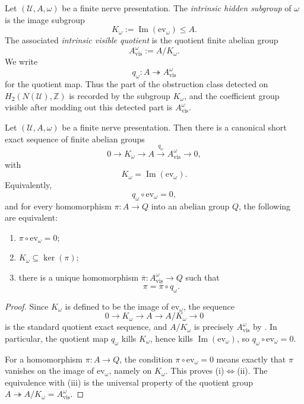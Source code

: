 \begin{definition}\label{def:intrinsic-visible-quotient}
Let $(\mathcal U,A,\omega)$ be a finite nerve presentation. The
\emph{intrinsic hidden subgroup} of $\omega$ is the image subgroup
\[
K_{\omega}:=\operatorname{Im}(\mathrm{ev}_{\omega})\le A.
\]
The associated \emph{intrinsic visible quotient} is the quotient finite
abelian group
\[
A_{\mathrm{vis}}^{\omega}:=A/K_{\omega}.
\]
We write
\[
q_{\omega}:A\twoheadrightarrow A_{\mathrm{vis}}^{\omega}
\]
for the quotient map. Thus the part of the obstruction class detected on
$H_2(N(\mathcal U),\mathbb Z)$ is recorded by the subgroup $K_{\omega}$, and
the coefficient group visible after modding out this detected part is
$A_{\mathrm{vis}}^{\omega}$.
\end{definition}

\begin{proposition}\label{prop:visible-quotient-quotient-sequence}
Let $(\mathcal U,A,\omega)$ be a finite nerve presentation. Then there is a
canonical short exact sequence of finite abelian groups
\[
0\longrightarrow K_{\omega}\longrightarrow A
\xrightarrow{\ q_{\omega}\ } A_{\mathrm{vis}}^{\omega}\longrightarrow 0,
\]
with
\[
K_{\omega}=\operatorname{Im}(\mathrm{ev}_{\omega}).
\]
Equivalently,
\[
q_{\omega}\circ \mathrm{ev}_{\omega}=0,
\]
and for every homomorphism $\pi:A\to Q$ into an abelian group $Q$, the
following are equivalent:
\begin{enumerate}[label=(\roman*),nosep]
\item $\pi\circ \mathrm{ev}_{\omega}=0$;
\item $K_{\omega}\subseteq \ker(\pi)$;
\item there is a unique homomorphism $\overline\pi:A_{\mathrm{vis}}^{\omega}\to Q$
such that
\[
\pi=\overline\pi\circ q_{\omega}.
\]
\end{enumerate}
\end{proposition}

\begin{proof}
Since $K_{\omega}$ is defined to be the image of $\mathrm{ev}_{\omega}$, the
sequence
\[
0\longrightarrow K_{\omega}\longrightarrow A\longrightarrow A/K_{\omega}
\longrightarrow 0
\]
is the standard quotient exact sequence, and $A/K_{\omega}$ is precisely
$A_{\mathrm{vis}}^{\omega}$ by . In
particular, the quotient map $q_{\omega}$ kills $K_{\omega}$, hence kills
$\operatorname{Im}(\mathrm{ev}_{\omega})$, so
$q_{\omega}\circ \mathrm{ev}_{\omega}=0$.

For a homomorphism $\pi:A\to Q$, the condition
$\pi\circ \mathrm{ev}_{\omega}=0$ means exactly that $\pi$ vanishes on the
image of $\mathrm{ev}_{\omega}$, namely on $K_{\omega}$. This proves
\textup{(i)}$\Leftrightarrow$\textup{(ii)}. The equivalence with
\textup{(iii)} is the universal property of the quotient group
$A\twoheadrightarrow A/K_{\omega}=A_{\mathrm{vis}}^{\omega}$.
\end{proof}

